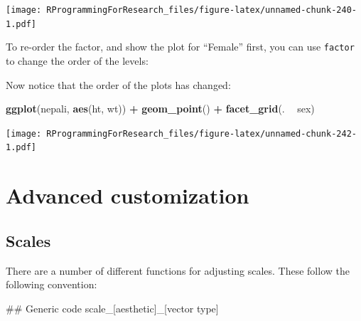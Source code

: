 \documentclass[]{book}
\makeatletter
\newenvironment{Shaded}{\begin{snugshade}}{\end{snugshade}}
\newcommand{\KeywordTok}[1]{\textcolor[rgb]{0.13,0.29,0.53}{\textbf{#1}}}
\newcommand{\DataTypeTok}[1]{\textcolor[rgb]{0.13,0.29,0.53}{#1}}
\newcommand{\StringTok}[1]{\textcolor[rgb]{0.31,0.60,0.02}{#1}}
\newcommand{\OperatorTok}[1]{\textcolor[rgb]{0.81,0.36,0.00}{\textbf{#1}}}
\newcommand{\NormalTok}[1]{#1}
\newenvironment{kframe}{%
\medskip{}
\setlength{\fboxsep}{.8em}
 \def\at@end@of@kframe{}%
 \ifinner\ifhmode%
  \def\at@end@of@kframe{\end{minipage}}%
  \begin{minipage}{\columnwidth}%
 \fi\fi%
 \def\FrameCommand##1{\hskip\@totalleftmargin \hskip-\fboxsep
 \colorbox{shadecolor}{##1}\hskip-\fboxsep
     \hskip-\linewidth \hskip-\@totalleftmargin \hskip\columnwidth}%
 \MakeFramed {\advance\hsize-\width
   \@totalleftmargin\z@ \linewidth\hsize
   \@setminipage}}%
 {\par\unskip\endMakeFramed%
 \at@end@of@kframe}
\renewenvironment{Shaded}{\begin{kframe}}{\end{kframe}}
\theoremstyle{definition}
\theoremstyle{definition}
\theoremstyle{definition}
\theoremstyle{remark}
\makeatother
\begin{document}
\texttt{[image: RProgrammingForResearch\_files/figure-latex/unnamed-chunk-240-1.pdf]}

To re-order the factor, and show the plot for ``Female'' first, you can
use \texttt{factor} to change the order of the levels:

\begin{Shaded}
\end{Shaded}

Now notice that the order of the plots has changed:

\begin{Shaded}
\begin{Highlighting}[]
\KeywordTok{ggplot}\NormalTok{(nepali, }\KeywordTok{aes}\NormalTok{(ht, wt)) }\OperatorTok{+}\StringTok{ }
\StringTok{        }\KeywordTok{geom_point}\NormalTok{() }\OperatorTok{+}\StringTok{ }
\StringTok{        }\KeywordTok{facet_grid}\NormalTok{(. }\OperatorTok{~}\StringTok{ }\NormalTok{sex)}
\end{Highlighting}
\end{Shaded}

\texttt{[image: RProgrammingForResearch\_files/figure-latex/unnamed-chunk-242-1.pdf]}

\section{Advanced customization}\label{advanced-customization}

\subsection{Scales}\label{scales}

There are a number of different functions for adjusting scales. These
follow the following convention:

\begin{Shaded}
\begin{Highlighting}[]
\NormalTok{## Generic code}
\NormalTok{scale_[aesthetic]_[vector type]}
\end{Highlighting}
\end{Shaded}
\end{document}
